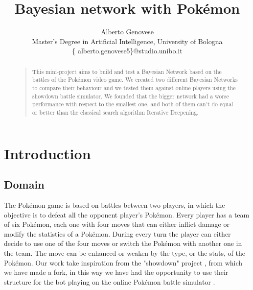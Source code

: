 \documentclass[letterpaper]{article}
\begin{document}
%
\title{Bayesian network with Pokémon}
\author{Alberto Genovese\\
Master's Degree in Artificial Intelligence, University of Bologna\\
\{ alberto.genovese5\}@studio.unibo.it
}
\maketitle



\begin{abstract}
\begin{quote}
This mini-project aims to build and test a Bayesian Network based on the battles of the Pokémon video game. We created two different Bayesian Networks to compare their behaviour and we tested them against online players using the showdown battle simulator. We founded that the bigger network had a worse performance with respect to the smallest one, and both of them can't do equal or better than the classical search algorithm Iterative Deepening.



\end{quote}
\end{abstract}


\section{Introduction}
\subsection{Domain}
The Pokémon game is based on battles between two players, in which the objective is to defeat all the opponent player's Pokémon. Every player has a team of six Pokémon, each one with four moves that can either inflict damage or modify the statistics of a Pokémon. During every turn the player can either decide to use one of the four moves or switch the Pokémon with another one in the team. The move can be enhanced or weaken by the type, or the stats, of the Pokémon.
Our work take inspiration from the "showdown" project \cite{bot}, from which we have made a fork, in this way we have had the opportunity to use their structure for the bot playing on the online Pokémon battle simulator \cite{showdown}.
\end{document}
